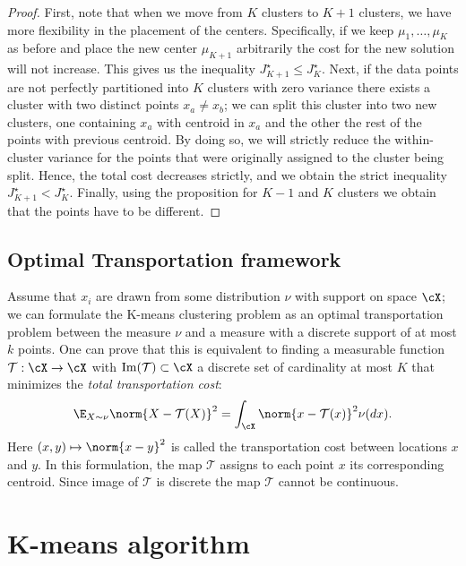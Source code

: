 \begin{proof}
First, note that when we move from $K$ clusters to $K+1$ clusters, we have
more flexibility in the placement of the centers. Specifically, if we keep
$\mu_1, \ldots, \mu_K$ as before and place the new center $\mu_{K+1}$ arbitrarily
the cost for the new solution will not increase. This gives us the inequality
$J_{K+1}^\star \le J_K^\star$. Next, if the data points are not perfectly
partitioned into $K$ clusters with zero variance there exists a cluster with
two distinct points $x_a \neq x_b$; we can split this cluster into two new
clusters, one containing $x_a$ with centroid in $x_a$ and the other the rest
of the points with previous centroid. By doing so, we will strictly reduce the
within-cluster variance for the points that were originally assigned to the
cluster being split. Hence, the total cost decreases strictly, and we obtain
the strict inequality $J_{K+1}^\star < J_K^\star$.
Finally, using the proposition for $K-1$ and $K$ clusters we obtain that the
points have to be different.
\end{proof}

\subsection{Optimal Transportation framework}

Assume that $x_i$ are drawn from some distribution $\nu$ with support on space
$\cX$; we can formulate the K-means clustering problem as an optimal
transportation problem \cite{turinici25} between the measure $\nu$ and a
measure with a discrete support of at most $k$ points. One can prove that this
is equivalent to finding a measurable function $\mathcal{T} : \cX \to \cX$
with $\mathrm{Im}(\mathcal{T}) \subset \cX$ a discrete set of cardinality at
most $K$ that minimizes the \emph{total transportation cost}:
\begin{equation}\label{eq:ch8-OT-cost}
\E_{X \sim \nu} \norm{X - \mathcal{T}(X)}^2
= \int_{\cX} \norm{x - \mathcal{T}(x)}^2 \nu(dx).
\end{equation}
Here $(x, y) \mapsto \norm{x - y}^2$ is called the transportation cost between
locations $x$ and $y$. In this formulation, the map $\mathcal{T}$ assigns to
each point $x$ its corresponding centroid. Since image of $\mathcal{T}$ is
discrete the map $\mathcal{T}$ cannot be continuous.

\section{K-means algorithm}

